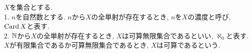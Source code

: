 \begin{definition}[p184の定義7.1.3]
	\label{definition:合論的な自然数の定義}
	$X$を集合とする.\\
	1. $n$を自然数とする.
	$n$から$X$の全単射が存在するとき,
	$n$を$X$の濃度と呼び,
	$\operatorname{Card}X$と表す.\\
	2. $\mathbb{N}$から$X$の全単射が存在するとき,
	$X$は可算無限集合であるといい,
	$\aleph_0$と表す.\\
	$X$が有限集合であるか可算無限集合であるとき,
	$X$は可算であるという.
\end{definition}
